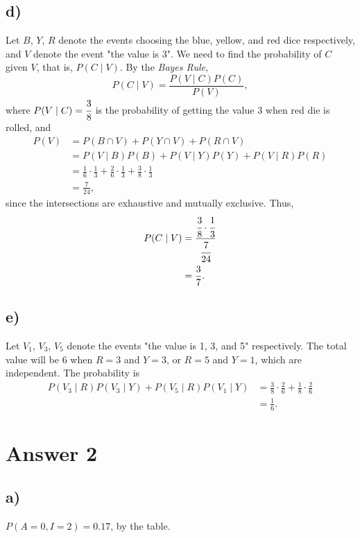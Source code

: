 \documentclass[12pt]{article}
\begin{document}
\subsection*{d)}
Let $B$, $Y$, $R$ denote the events choosing the blue, yellow, and red dice respectively, and $V$ denote the event "the value is 3". We need to find the probability of $C$ given $V$, that is, $P(C \mid V)$. By the \textit{Bayes Rule},
\[ P(C \mid V) = \frac{P(V \mid C) P(C)}{P(V)}, \]
where $P(V \mid C) = \cfrac{3}{8}$ is the probability of getting the value 3 when red die is rolled, and
\begin{align*}
    P(V) &= P(B \cap V) + P(Y \cap V) + P(R \cap V) \\
         &= P(V \mid B) P(B) + P(V \mid Y) P(Y) + P(V \mid R) P(R) \\
         &= \frac{1}{6} \cdot \frac{1}{3} + \frac{2}{6} \cdot \frac{1}{3} + \frac{3}{8} \cdot \frac{1}{3} \\
         &= \frac{7}{24},
\end{align*}
since the intersections are exhaustive and mutually exclusive. Thus,
\begin{align*}
    P(C \mid V) &= \frac{\cfrac{3}{8} \cdot \cfrac{1}{3}}{\cfrac{7}{24}} \\
    &= \frac{3}{7}.
\end{align*}

\subsection*{e)}
Let $V_1$, $V_3$, $V_5$ denote the events "the value is 1, 3, and 5" respectively. The total value will be 6 when $R = 3$ and $Y = 3$, or $R = 5$ and $Y = 1$, which are independent. The probability is
\begin{align*}
    P(V_3 \mid R) P(V_3 \mid Y) + P(V_5 \mid R) P(V_1 \mid Y) &= \frac{3}{8} \cdot \frac{2}{6} + \frac{1}{8} \cdot \frac{2}{6} \\
    &= \frac{1}{6}.
\end{align*}


\section*{Answer 2}

\subsection*{a)}
$P(A = 0, I = 2) = 0.17$, by the table.
\end{document}
